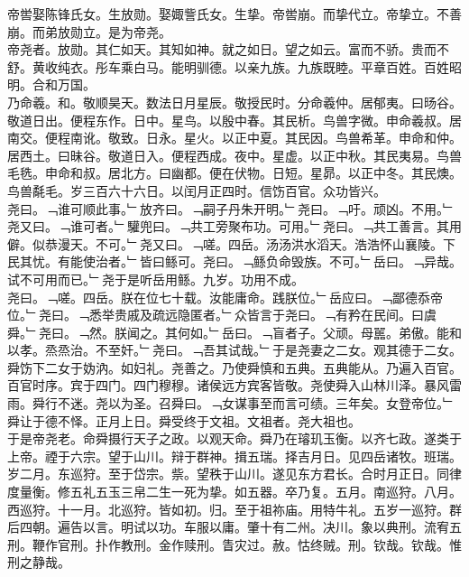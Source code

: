\documentclass{zhvt-classic}
\begin{document}
\hspace*{2em}帝喾娶陈锋氏女。生放勋。娶娵訾氏女。生挚。帝喾崩。而挚代立。帝挚立。不善崩。而弟放勋立。是为帝尧。\\
\hspace*{2em}帝尧者。放勋。其仁如天。其知如神。就之如日。望之如云。富而不骄。贵而不舒。黄收纯衣。彤车乘白马。能明驯德。以亲九族。九族既睦。平章百姓。百姓昭明。合和万国。\\
\hspace*{2em}乃命羲。和。敬顺昊天。数法日月星辰。敬授民时。分命羲仲。居郁夷。曰旸谷。敬道日出。便程东作。日中。星鸟。以殷中春。其民析。鸟兽字微。申命羲叔。居南交。便程南讹。敬致。日永。星火。以正中夏。其民因。鸟兽希革。申命和仲。居西土。曰昧谷。敬道日入。便程西成。夜中。星虚。以正中秋。其民夷易。鸟兽毛毨。申命和叔。居北方。曰幽都。便在伏物。日短。星昴。以正中冬。其民燠。鸟兽氄毛。岁三百六十六日。以闰月正四时。信饬百官。众功皆兴。\\
\hspace*{2em}尧曰。﹁谁可顺此事。﹂放齐曰。﹁嗣子丹朱开明。﹂尧曰。﹁吁。顽凶。不用。﹂尧又曰。﹁谁可者。﹂驩兜曰。﹁共工旁聚布功。可用。﹂尧曰。﹁共工善言。其用僻。似恭漫天。不可。﹂尧又曰。﹁嗟。四岳。汤汤洪水滔天。浩浩怀山襄陵。下民其忧。有能使治者。﹂皆曰鲧可。尧曰。﹁鲧负命毁族。不可。﹂岳曰。﹁异哉。试不可用而已。﹂尧于是听岳用鲧。九岁。功用不成。\\
\hspace*{2em}尧曰。﹁嗟。四岳。朕在位七十载。汝能庸命。践朕位。﹂岳应曰。﹁鄙德忝帝位。﹂尧曰。﹁悉举贵戚及疏远隐匿者。﹂众皆言于尧曰。﹁有矜在民间。曰虞舜。﹂尧曰。﹁然。朕闻之。其何如。﹂岳曰。﹁盲者子。父顽。母嚚。弟傲。能和以孝。烝烝治。不至奸。﹂尧曰。﹁吾其试哉。﹂于是尧妻之二女。观其德于二女。舜饬下二女于妫汭。如妇礼。尧善之。乃使舜慎和五典。五典能从。乃遍入百官。百官时序。宾于四门。四门穆穆。诸侯远方宾客皆敬。尧使舜入山林川泽。暴风雷雨。舜行不迷。尧以为圣。召舜曰。﹁女谋事至而言可绩。三年矣。女登帝位。﹂舜让于德不怿。正月上日。舜受终于文祖。文祖者。尧大祖也。\\
\hspace*{2em}于是帝尧老。命舜摄行天子之政。以观天命。舜乃在璿玑玉衡。以齐七政。遂类于上帝。禋于六宗。望于山川。辩于群神。揖五瑞。择吉月日。见四岳诸牧。班瑞。岁二月。东巡狩。至于岱宗。祡。望秩于山川。遂见东方君长。合时月正日。同律度量衡。修五礼五玉三帛二生一死为挚。如五器。卒乃复。五月。南巡狩。八月。西巡狩。十一月。北巡狩。皆如初。归。至于祖祢庙。用特牛礼。五岁一巡狩。群后四朝。遍告以言。明试以功。车服以庸。肇十有二州。决川。象以典刑。流宥五刑。鞭作官刑。扑作教刑。金作赎刑。眚灾过。赦。怙终贼。刑。钦哉。钦哉。惟刑之静哉。\\
\end{document}
